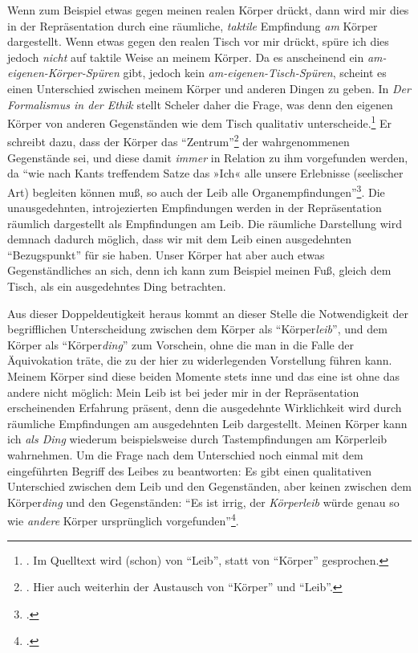 \documentclass[a4paper, 12pt]{article}
\begin{document}
\begin{onehalfspace}
Wenn zum Beispiel etwas gegen meinen realen Körper drückt, dann wird mir dies in der Repräsentation durch eine räumliche, \emph{taktile} Empfindung \emph{am} Körper dargestellt. Wenn etwas gegen den realen Tisch vor mir drückt, spüre ich dies jedoch \emph{nicht} auf taktile Weise an meinem Körper. Da es anscheinend ein \emph{am-eigenen-Körper-Spüren} gibt, jedoch kein \emph{am-eigenen-Tisch-Spüren}, scheint es einen Unterschied zwischen meinem Körper und anderen Dingen zu geben. In \emph{Der Formalismus in der Ethik} stellt Scheler daher die Frage, was denn den eigenen Körper von anderen Gegenständen wie dem Tisch qualitativ unterscheide.\footnote{\Cite[Vgl.][S. 498]{scheler-ethik}. Im Quelltext wird (schon) von "`Leib"', statt von "`Körper"' gesprochen.} Er schreibt dazu, dass der Körper das "`Zentrum"'\footnote{\Cite[Vgl.][S. 498]{scheler-ethik}. Hier auch weiterhin der Austausch von "`Körper"' und "`Leib"'.} der wahrgenommenen Gegenstände sei, und diese damit \emph{immer} in Relation zu ihm vorgefunden werden, da "`wie nach Kants treffendem Satze das »Ich« alle unsere Erlebnisse (seelischer Art) begleiten können muß, so auch der Leib alle Organempfindungen"'\footnote{\Cite[Siehe][S. 495]{scheler-ethik}.}. Die unausgedehnten, introjezierten Empfindungen werden in der Repräsentation räumlich dargestellt als Empfindungen am Leib. Die räumliche Darstellung wird demnach dadurch möglich, dass wir mit dem Leib einen ausgedehnten "`Bezugspunkt"' für sie haben. Unser Körper hat aber auch etwas Gegenständliches an sich, denn ich kann zum Beispiel meinen Fuß, gleich dem Tisch, als ein ausgedehntes Ding betrachten. 

Aus dieser Doppeldeutigkeit heraus kommt an dieser Stelle die Notwendigkeit der begrifflichen Unterscheidung zwischen dem Körper als "`Körper\emph{leib}"', und dem Körper als "`Körper\emph{ding}"' zum Vorschein, ohne die man in die Falle der Äquivokation träte, die zu der hier zu widerlegenden Vorstellung führen kann. Meinem Körper sind diese beiden Momente stets inne und das eine ist ohne das andere nicht möglich: Mein Leib ist bei jeder mir in der Repräsentation erscheinenden Erfahrung präsent, denn die ausgedehnte Wirklichkeit wird durch räumliche Empfindungen am ausgedehnten Leib dargestellt. Meinen Körper kann ich \emph{als Ding} wiederum beispielsweise durch Tastempfindungen am Körperleib wahrnehmen. Um die Frage nach dem Unterschied noch einmal mit dem eingeführten Begriff des Leibes zu beantworten: Es gibt einen qualitativen Unterschied zwischen dem Leib und den Gegenständen, aber keinen zwischen dem Körper\emph{ding} und den Gegenständen: "`Es ist irrig, der \emph{Körperleib} würde genau so wie \emph{andere} Körper ursprünglich vorgefunden"'\footnote{\Cite[Siehe][S. 494]{scheler-ethik}.}.


\end{onehalfspace}
\end{document}

